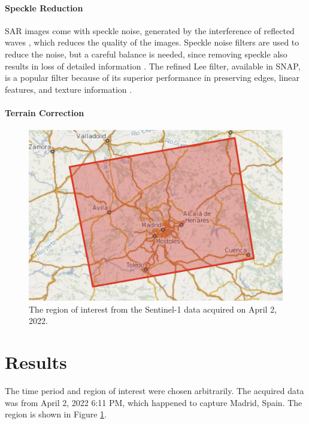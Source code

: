 \documentclass[conference]{IEEEtran}
\begin{document}
	\paragraph{Speckle Reduction}
	SAR images come with speckle noise, generated by the interference of reflected waves \cite{Filipponi_2019}, which reduces the quality of the images.
	Speckle noise filters are used to reduce the noise, but a careful balance is needed, since removing speckle also results in loss of detailed information \cite{Yommy_2015}. 
	The refined Lee filter, available in SNAP, is a popular filter because of its superior performance in preserving edges, linear features, and texture information \cite{Filipponi_2019}.
	
	\paragraph{Terrain Correction}
	
	
	\begin{figure}[htbp]
		\centerline{\includegraphics[scale=0.25]{Images/Madrid_SLC_IW_Data.PNG}}
		\caption{The region of interest from the Sentinel-1 data acquired on April 2, 2022.}
		\label{img:Madrid_SLC_IW_Data}
	\end{figure}

	\section{Results}
	The time period and region of interest were chosen arbitrarily. 
	The acquired data was from April 2, 2022 6:11 PM, which happened to capture Madrid, Spain. The region is shown in Figure \ref{img:Madrid_SLC_IW_Data}. 
	
\end{document}
